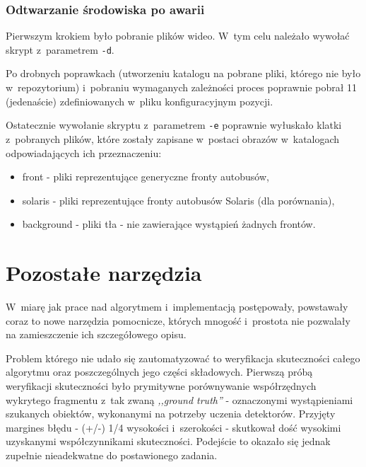 

\subsubsection{Odtwarzanie środowiska po awarii}

Pierwszym krokiem było pobranie plików wideo. W~tym celu należało wywołać skrypt
z~parametrem \verb|-d|.

Po drobnych poprawkach (utworzeniu katalogu na pobrane pliki, którego nie było
w~repozytorium) i~pobraniu wymaganych zależności proces poprawnie pobrał
11 (jedenaście) zdefiniowanych w~pliku konfiguracyjnym pozycji.

Ostatecznie wywołanie skryptu z~parametrem \verb|-e| poprawnie wyłuskało klatki
z~pobranych plików, które zostały zapisane w~postaci obrazów w~katalogach
odpowiadających ich przeznaczeniu:

\begin{itemize}
\item front - pliki reprezentujące generyczne fronty autobusów,
\item solaris - pliki reprezentujące fronty autobusów Solaris (dla porównania),
\item background - pliki tła - nie zawierające wystąpień żadnych frontów.
\end{itemize}


\section{Pozostałe narzędzia}

W~miarę jak prace nad algorytmem i~implementacją postępowały, powstawały
coraz to nowe narzędzia pomocnicze, których mnogość i~prostota nie
pozwalały na zamieszczenie ich szczegółowego opisu. 

Problem którego nie udało się zautomatyzować to weryfikacja skuteczności
całego algorytmu oraz poszczególnych jego części składowych. Pierwszą
próbą weryfikacji skuteczności było prymitywne porównywanie współrzędnych
wykrytego fragmentu z~tak zwaną \textit{,,ground truth''} - oznaczonymi
wystąpieniami szukanych obiektów, wykonanymi na potrzeby uczenia 
detektorów. 
Przyjęty margines błędu - (+/-) 1/4 wysokości i~szerokości - skutkował dość
wysokimi uzyskanymi współczynnikami skuteczności. Podejście to okazało
się jednak zupełnie nieadekwatne do postawionego zadania.

